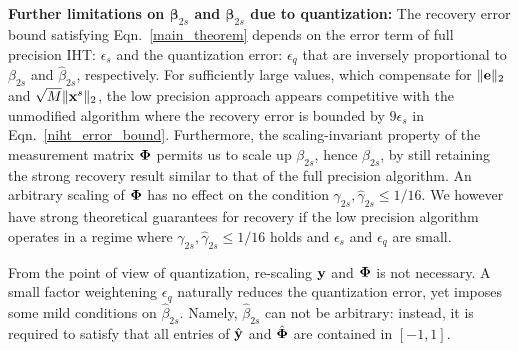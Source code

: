 \documentclass[aoas,preprint]{imsart}
\numberwithin{equation}{section}
\theoremstyle{plain}
\begin{document}
\vspace{0.5em}
{\bf Further limitations on ${\boldsymbol{\beta}}_{2s}$ and $\hat{\boldsymbol{\beta}}_{2s}$ due to quantization:} The recovery error bound satisfying Eqn.~\ref{main_theorem} depends on the error term of full precision IHT: $ {\epsilon_s}$ and the quantization error: $ {\epsilon}_q$ that are inversely proportional to ${\beta}_{2s}$ and $\hat{\beta}_{2s}$, respectively. For sufficiently large values, which compensate for $\|{\bf e}\|_2$ and $\sqrt{M} \|{\bf x}^s \|_2$, the low precision approach appears competitive with the unmodified algorithm where the recovery error is bounded by $9\epsilon_s$ in Eqn.~\ref{niht_error_bound}. Furthermore, the scaling-invariant property of the measurement matrix ${\bf \Phi}$ permits us to scale up ${\beta}_{2s}$, hence $\hat{\beta}_{2s}$, by still retaining the strong recovery result similar to that of the full precision algorithm. An arbitrary scaling of ${\bf \Phi}$ has no effect on the condition ${\gamma}_{2s}, \hat{\gamma}_{2s}\leq 1/16$. We however have strong theoretical guarantees for recovery if the low precision algorithm operates in a regime where ${\gamma}_{2s}, \hat{\gamma}_{2s}\leq 1/16$ holds and ${\epsilon}_s$  and ${\epsilon}_q$ are small.

From the  point of view of quantization, re-scaling ${\bf y}$ and ${\bf \Phi}$ is not necessary. A small factor weightening ${\epsilon}_q$ naturally reduces the quantization error, yet imposes some mild conditions on $\hat{\beta}_{2s}$. Namely, $\hat{\beta}_{2s}$ can not be arbitrary: instead, it is required to satisfy that all entries of $\hat {\bf y}$ and $\hat{\bf \Phi}$ are contained in $[-1, 1]$.
\end{document}
